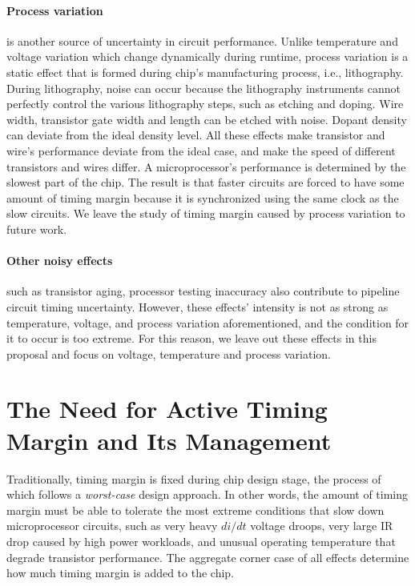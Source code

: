 \paragraph{Process variation} is another source of uncertainty in circuit performance. Unlike temperature and voltage variation which change dynamically during runtime, process variation is a static effect that is formed during chip's manufacturing process, i.e., lithography. During lithography, noise can occur because the lithography instruments cannot perfectly control the various lithography steps, such as etching and doping. Wire width, transistor gate width and length can be etched with noise. Dopant density can deviate from the ideal density level. All these effects make transistor and wire's performance deviate from the ideal case, and make the speed of different transistors and wires differ. A microprocessor's performance is determined by the slowest part of the chip. The result is that faster circuits are forced to have some amount of timing margin because it is synchronized using the same clock as the slow circuits. We leave the study of timing margin caused by process variation to future work.

\paragraph{Other noisy effects} such as transistor aging, processor testing inaccuracy also contribute to pipeline circuit timing uncertainty. However, these effects' intensity is not as strong as temperature, voltage, and process variation aforementioned, and the condition for it to occur is too extreme. For this reason, we leave out these effects in this proposal and focus on voltage, temperature and process variation.

\section{The Need for Active Timing Margin and Its Management}
\label{sec:background:motivation}

Traditionally, timing margin is fixed during chip design stage, the process of which follows a \textit{worst-case} design approach. In other words, the amount of timing margin must be able to tolerate the most extreme conditions that slow down microprocessor circuits, such as very heavy $di/dt$ voltage droops, very large IR drop caused by high power workloads, and unusual operating temperature that degrade transistor performance. The aggregate corner case of all effects determine how much timing margin is added to the chip.

